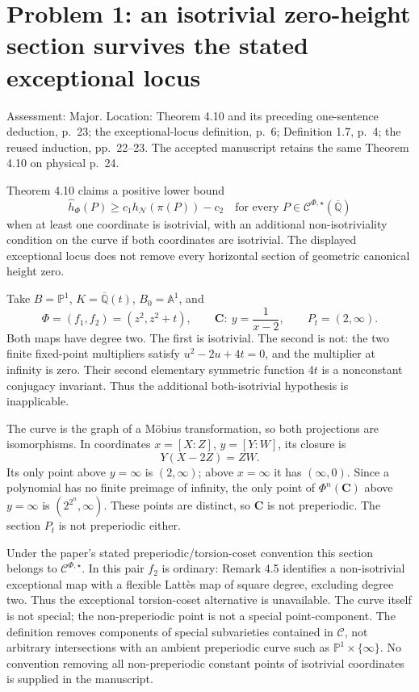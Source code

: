 \documentclass[10pt]{article}
\begin{document}
\section*{Problem 1: an isotrivial zero-height section survives the stated exceptional locus}
Assessment: Major. Location: Theorem 4.10 and its preceding one-sentence deduction, p. 23; the exceptional-locus definition, p. 6; Definition 1.7, p. 4; the reused induction, pp. 22–23. The accepted manuscript retains the same Theorem 4.10 on physical p. 24.\par
Theorem 4.10 claims a positive lower bound \[\widehat h_\Phi(P)\ge c_1h_{\mathcal N}(\pi(P))-c_2
 \quad\text{for every }P\in\mathcal C^{\Phi,\star}(\overline{\mathbb Q})\] when at least one coordinate is isotrivial, with an additional non-isotriviality condition on the curve if both coordinates are isotrivial. The displayed exceptional locus does not remove every horizontal section of geometric canonical height zero.\par
Take \(B=\mathbb P^1\), \(K=\overline{\mathbb Q}(t)\), \(B_0=\mathbb A^1\), and \[\Phi=(f_1,f_2)=(z^2,z^2+t),\qquad
 \mathbf C:\ y=\frac1{x-2},\qquad P_t=(2,\infty).\] Both maps have degree two. The first is isotrivial. The second is not: the two finite fixed-point multipliers satisfy \(u^2-2u+4t=0\), and the multiplier at infinity is zero. Their second elementary symmetric function \(4t\) is a nonconstant conjugacy invariant. Thus the additional both-isotrivial hypothesis is inapplicable.\par
The curve is the graph of a Möbius transformation, so both projections are isomorphisms. In coordinates \(x=[X:Z]\), \(y=[Y:W]\), its closure is \[Y(X-2Z)=ZW.\] Its only point above \(y=\infty\) is \((2,\infty)\); above \(x=\infty\) it has \((\infty,0)\). Since a polynomial has no finite preimage of infinity, the only point of \(\Phi^n(\mathbf C)\) above \(y=\infty\) is \((2^{2^n},\infty)\). These points are distinct, so \(\mathbf C\) is not preperiodic. The section \(P_t\) is not preperiodic either.\par
Under the paper’s stated preperiodic/torsion-coset convention this section belongs to \(\mathcal C^{\Phi,\star}\). In this pair \(f_2\) is ordinary: Remark 4.5 identifies a non-isotrivial exceptional map with a flexible Lattès map of square degree, excluding degree two. Thus the exceptional torsion-coset alternative is unavailable. The curve itself is not special; the non-preperiodic point is not a special point-component. The definition removes components of special subvarieties contained in \(\mathcal C\), not arbitrary intersections with an ambient preperiodic curve such as \(\mathbb P^1\times\{\infty\}\). No convention removing all non-preperiodic constant points of isotrivial coordinates is supplied in the manuscript.\par
\end{document}
